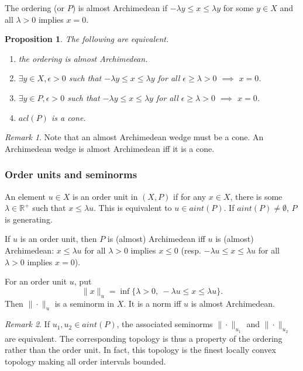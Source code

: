 \documentclass[12pt]{article}
\newtheorem{prop}{Proposition}
\theoremstyle{remark}
\newtheorem{rem}{Remark}
\newcommand{\<}{\langle}
\begin{document}
The ordering (or $P$) is almost Archimedean if $-\lambda y\le x\le \lambda y$ for some $y\in X$ and  all $\lambda> 0$ implies  $x=0$.

\begin{prop}
The following are equivalent.
\begin{enumerate}
\item[(i)] the ordering is almost Archimedean.
\item[(ii)]  $\exists y\in X, \epsilon >0$ such that  $-\lambda y\le x\le \lambda y$ for all $\epsilon\ge \lambda>0$ $\implies$ $x= 0$.
\item[(iii)] $\exists y\in P, \epsilon >0$ such that  $-\lambda y\le x\le \lambda y$ for all $\epsilon\ge \lambda>0$ $\implies$ $x= 0$.
\item[(iv)] $acl(P)$ is a cone.
\end{enumerate}
\end{prop}

\begin{rem}
Note that an almost Archimedean wedge must be a cone. An Archimedean  wedge is almost Archimedean iff it is a cone.
\end{rem}

\subsubsection*{Order units and seminorms}

 An element $u\in X$ is an order unit in $(X,P)$ if for any $x\in X$, there is some $\lambda\in \mathbb R^+$ such that 
 $x\le \lambda u$. This is equivalent to $u\in aint(P)$. If $aint(P)\ne \emptyset$, $P$ is generating.  

If $u$ is an order unit, then $P$ is (almost) Archimedean iff 
$u$ is (almost) Archimedean: $x\le \lambda u$ for all $\lambda>0$ implies $x\le 0$ (resp. $-\lambda u\le x\le \lambda u$ for all $\lambda>0$ implies $x=0$). 



For an order unit $u$, put
 \[
\|x\|_u=\inf\{\lambda>0,\ -\lambda u\le x\le \lambda u\}.
 \]
Then $\|\cdot\|_u$ is a seminorm in $X$. It is a norm iff  $u$ is almost Archimedean. 

\begin{rem}
If $u_1,u_2\in aint(P)$, the associated seminorms $\|\cdot\|_{u_1}$ and $\|\cdot\|_{u_2}$ are equivalent. The corresponding topology is thus a property of the ordering rather than the order unit. In fact, this topology is the finest locally convex topology 
 making all order intervals bounded.
\end{rem}
 
\end{document}
